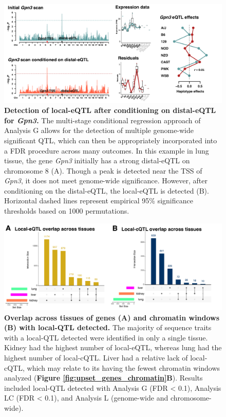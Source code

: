 \documentclass[9pt,twocolumn,twoside]{gsajnl}
\begin{document}
\clearpage

\begin{figure}[hp]
\renewcommand{\familydefault}{\sfdefault}\normalfont
\centering
\includegraphics[width=\textwidth, trim={0in 0in 0in 0in}, clip]{figs/gpn3_conditional_scan.pdf}
\caption{\textbf{Detection of local-eQTL after conditioning on distal-eQTL for \textit{Gpn3}.} The multi-stage conditional regression approach of Analysis G allows for the detection of multiple genome-wide significant QTL, which can then be appropriately incorporated into a FDR procedure across many outcomes. In this example in lung tissue, the gene \textit{Gpn3} initially has a strong distal-eQTL on chromosome 8 (A). Though a peak is detected near the TSS of \textit{Gpn3}, it does not meet genome-wide significance. However, after conditioning on the distal-eQTL, the local-eQTL is detected (B). Horizontal dashed lines represent empirical 95\% significance thresholds based on 1000 permutations.
\label{fig:conditional_scans}}
\end{figure}

\begin{figure}[hp]
\renewcommand{\familydefault}{\sfdefault}\normalfont
\centering
\includegraphics[width=\textwidth, trim={0in 0in 0in 0in}, clip]{figs/upset_eqtl_cqtl.pdf}
\caption{\textbf{Overlap across tissues of genes (A) and chromatin windows (B) with local-QTL detected.} The majority of sequence traits with a local-QTL detected were identified in only a single tissue. Kidney had the highest number of local-eQTL, whereas lung had the highest number of local-cQTL. Liver had a relative lack of local-cQTL, which may relate to its having the fewest chromatin windows analyzed (\textbf{Figure \ref{fig:upset_genes_chromatin}B}). Results included local-QTL detected with Analysis G (FDR < 0.1), Analysis LC (FDR < 0.1), and Analysis L (genome-wide and chromosome-wide). 
\label{fig:upset_eqtl_cqtl}}
\end{figure}
\end{document}
